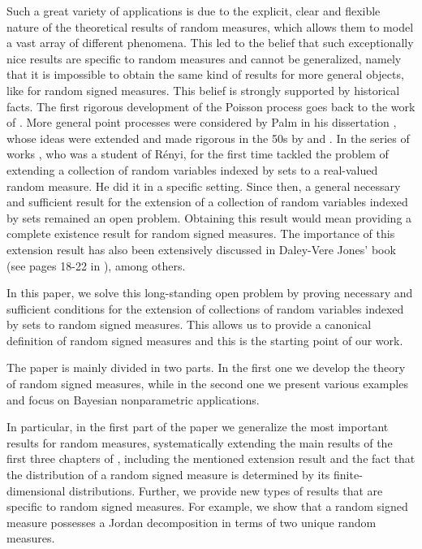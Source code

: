 \documentclass{article}
\theoremstyle{plain}
\theoremstyle{remark}
\begin{document}
Such a great variety of applications is due to the explicit, clear and flexible nature of the theoretical results of random measures, which allows them to model a vast array of different phenomena.  This led to the belief that such exceptionally nice results are specific to random measures and cannot be generalized, namely that it is impossible to obtain the same kind of results for more general objects, like for random signed measures. This belief is strongly supported by historical facts. The first rigorous development of the Poisson process goes back to the work of \citet{Levy}. More general point processes were considered by Palm in his dissertation \citet{Palm}, whose ideas were extended and made rigorous in the 50s by \citet{Khinchin} and \citet{Renyi56,Renyi57}. In the series of works \citet{PrekopaI,PrekopaII,PrekopaIII}, who was a student of R\'{e}nyi, for the first time tackled the problem of extending a collection of random variables indexed by sets to a real-valued random measure. He did it in a specific setting. Since then, a general necessary and sufficient result for the extension of a collection of random variables indexed by sets remained an open problem. Obtaining this result would mean providing a complete existence result for random signed measures. The importance of this extension result has also been extensively discussed in Daley-Vere Jones' book (see pages 18-22 in \citet{Daley}), among others.

In this paper, we solve this long-standing open problem by proving necessary and sufficient conditions for the extension of collections of random variables indexed by sets to random signed measures. This allows us to provide a canonical definition of random signed measures and this is the starting point of our work.

The paper is mainly divided in two parts. In the first one we develop the theory of random signed measures, while in the second one we present various examples and focus on Bayesian nonparametric applications.

In particular, in the first part of the paper we generalize the most important results for random measures, systematically extending the main results of the first three chapters of \citet{Kallenberg2}, including the mentioned extension result and the fact that the distribution of a random signed measure is determined by its finite-dimensional distributions. Further, we provide new types of results that are specific to random signed measures. For example, we show that a random signed measure possesses a Jordan decomposition in terms of two unique random measures.
\end{document}
